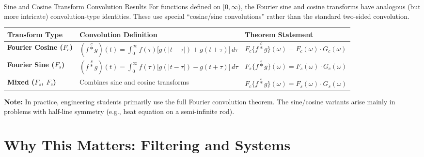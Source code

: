 \documentclass[12pt,a4paper]{article}
\begin{document}
\begin{infobox}{Sine and Cosine Transform Convolution Results}
For functions defined on $[0,\infty)$, the Fourier sine and cosine transforms have
analogous (but more intricate) convolution-type identities. These use special
``cosine/sine convolutions'' rather than the standard two-sided convolution.

\medskip
\begin{center}
\begin{tabular}{>{\bfseries}p{3.5cm} p{5.5cm} p{5.5cm}}
\toprule
Transform Type & Convolution Definition & Theorem Statement \\
\midrule
Fourier Cosine ($F_c$) &
  $\displaystyle (f \stackrel{c}{*} g)(t) = \int_0^\infty f(\tau)
  \bigl[g(|t-\tau|)+g(t+\tau)\bigr]\,d\tau$ &
  $F_c\{f \stackrel{c}{*} g\}(\omega) = F_c(\omega)\cdot G_c(\omega)$ \\[10pt]
Fourier Sine ($F_s$) &
  $\displaystyle (f \stackrel{s}{*} g)(t) = \int_0^\infty f(\tau)
  \bigl[g(|t-\tau|)-g(t+\tau)\bigr]\,d\tau$ &
  $F_s\{f \stackrel{s}{*} g\}(\omega) = F_s(\omega)\cdot G_c(\omega)$ \\[10pt]
Mixed ($F_s$, $F_c$) &
  Combines sine and cosine transforms &
  $F_c\{f \stackrel{s}{*} g\}(\omega) = F_s(\omega)\cdot G_s(\omega)$ \\
\bottomrule
\end{tabular}
\end{center}

\medskip
\textbf{Note:} In practice, engineering students primarily use the full Fourier
convolution theorem. The sine/cosine variants arise mainly in problems with
half-line symmetry (e.g., heat equation on a semi-infinite rod).
\end{infobox}

\section{Why This Matters: Filtering and Systems}
\end{document}
